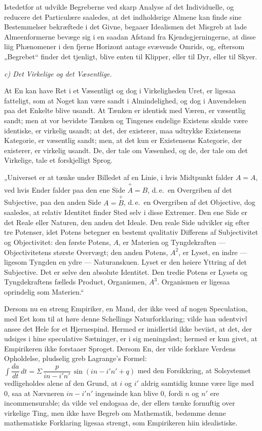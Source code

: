\documentclass[12pt]{book}
\newcommand{\opage}[1]{\marginnote{\footnotesize\textit{[#1]}}}
\begin{document}
Istedetfor at udvikle Begreberne ved skarp Analyse af det Individuelle, og reducere
det Particulære saaledes, at det indholdsrige Almene kan finde sine Bestemmelser
bekræftede i det Givne, begaaer Idealismen det Misgreb at lade Almeenformerne bevæge
sig i en saadan Afstand fra Kjendsgjerningerne, at disse liig Phænomener i den fjerne
Horizont antage svævende Omrids, og, eftersom „Begrebet“ finder det tjenligt, blive
enten til Klipper, eller til Dyr, eller til Skyer.

\emph{c) Det Virkelige og det Væsentlige.}

At En kan have Ret i et Væsentligt og dog i Virkeligheden Uret, er ligesaa fatteligt,
som at Noget kan være sandt i Almindelighed, og dog i Anvendelsen paa det Enkelte blive
usandt. At Tænken er identisk med Væren, er væsentlig sandt; men at vor bevidste Tænken
og Tingenes endelige Existens skulde være identiske, er virkelig usandt; at det, der
existerer, maa udtrykke Existensens Kategorie, er væsentlig sandt; men, at det kun er
Existensens Kategorie, der existerer, er virkelig usandt. De, der tale om Væsenhed, og
de, der tale om det Virkelige, tale et forskjelligt Sprog.

„Universet er at tænke under Billedet af en Linie, i hvis Midtpunkt falder $A = A$, ved
hvis Ender falder paa den ene Side $\overset{+}{A} = B$, d.\,e.\ en Overgriben af det
Subjective, paa den anden Side $A = \overset{+}{B}$, d.\,e.\ en Overgriben af det
Objective, dog saaledes, at relativ Identitet finder Sted
\opage{51} selv i disse Extremer. Den ene Side er det Reale eller Naturen, den anden det Ideale.
Den reale Side udvikler sig efter tre Potenser, idet Potens betegner en bestemt
qvalitativ Differens af Subjectivitet og Objectivitet: den første Potens, $A$, er
Materien og Tyngdekraften — Objectivitetens største Overvægt; den anden Potens, $A^2$,
er Lyset, en indre — ligesom Tyngden en ydre — Naturanskuen. Lyset er den høiere
Yttring af det Subjective. Det er selve den absolute Identitet. Den tredie Potens er
Lysets og Tyngdekraftens fælleds Product, Organismen, $A^3$. Organismen er ligesaa
oprindelig som Materien.“

Dersom nu en streng Empiriker, en Mand, der ikke veed af nogen Speculation, med Eet kom
til at høre denne Schellings Naturforklaring; vilde han udentvivl ansee det Hele for et
Hjernespind. Hermed er imidlertid ikke beviist, at det, der udsiges i hine speculative
Sætninger, er i sig meningsløst; hermed er kun givet, at Empirikeren ikke forstaaer
Sproget. Dersom En, der vilde forklare Verdens Opholdelse, pludselig greb Lagrange's
Formel: $\int \dfrac{da}{dt}\,dt = \Sigma\,\dfrac{p}{in-i'n'}\,\sin(in-i'n'+q)$ med den
Forsikkring, at Solsystemet vedligeholdes alene af den Grund, at $i$ og $i'$ aldrig
samtidig kunne være lige med $0$, saa at Nævneren $in-i'n'$ ingensinde kan blive $0$,
fordi $n$ og $n'$ ere incommensurable; da vilde vel endogsaa de, der ellers tænke
fornuftig over virkelige Ting, men ikke have Begreb om Mathematik, bedømme denne
mathematiske Forklaring ligesaa strengt, som Empirikeren hiin idealistiske.
\end{document}
